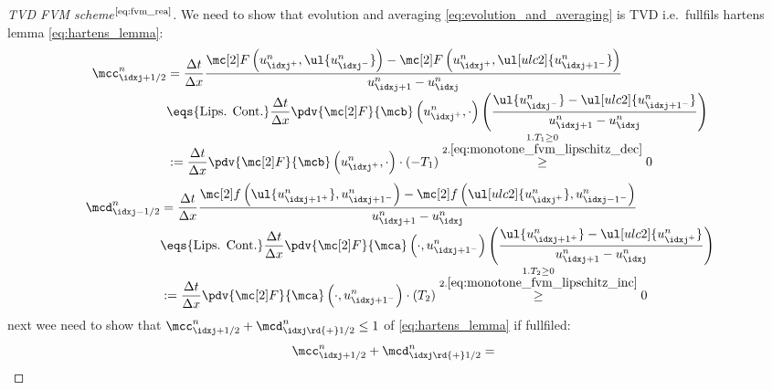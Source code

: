 \begin{proofbox}\nospacing
    \begin{proof}[TVD FVM scheme$^{\text{\cref{eq:fvm_rea}}}$]\label{proof:eq:fvm_rea}
        We need to show that evolution and averaging \cref{eq:evolution_and_averaging} is TVD i.e.\ fullfils hartens lemma \cref{eq:hartens_lemma}:
        \begin{align*}
          \mcc_{\idxj+1/2}^{n}&=\frac{\Delta t}{\Delta x}\frac{\Flux \left(u_{\idxj^+}^{n},\ul{u_{\idxj^{-}}^{n}}\right)-\Flux \left(u_{\idxj^+}^{n},\ul[ulc2]{u_{\idxj+1^{-}}^{n}}\right)}{u_{\idxj+1}^{n}-u_{\idxj}^{n}}\nonumber\\[-1\jot]
                              &\eqs{\text{Lips. Cont.}}\frac{\Delta t}{\Delta x}\pdv{\Flux}{\mcb}\left(u_{\idxj^{+}}^{n},\cdot\right)
                                \left(\frac{\ul{u_{\idxj^{-}}^{n}}-\ul[ulc2]{u_{\idxj+1^{-}}^{n}}}{u_{\idxj+1}^{n}-u_{\idxj}^{n}}\right)\\[-1\jot]
                              &:=\frac{\Delta t}{\Delta x}\pdv{\Flux}{\mcb}\left(u_{\idxj^{+}}^{n},\cdot\right)\cdot\left(-T_{1}\right)
                          \stackrel{\substack{1. T_{1}\geq0 \\2. \cref{eq:monotone_fvm_lipschitz_dec}}}{\geq}0
        \end{align*}
        \begin{align*}
          \mcd_{\idxj-1/2}^{n}&=\frac{\Delta t}{\Delta x}\frac{\flux \left(\ul{u_{\idxj+1^+}^{n}},u_{\idxj+1^{-}}^{n}\right)-\flux \left(\ul[ulc2]{u_{\idxj^+}^{n}},u_{\idxj-1^{-}}^{n}\right)}{u_{\idxj+1}^{n}-u_{\idxj}^{n}}\nonumber\\[-1\jot]
                              &\eqs{\text{Lips. Cont.}}\frac{\Delta t}{\Delta x}\pdv{\Flux}{\mca}\left(\cdot,u_{\idxj+1^{-}}^{n}\right)
                                \left(\frac{\ul{u_{\idxj+1^{+}}^{n}}-\ul[ulc2]{u_{\idxj^{+}}^{n}}}{u_{\idxj+1}^{n}-u_{\idxj}^{n}}\right)\\[-1\jot]
                              &:=\frac{\Delta t}{\Delta x}\pdv{\Flux}{\mca}\left(\cdot,u_{\idxj+1^{-}}^{n}\right)\cdot\left(T_{2}\right)
                          \stackrel{\substack{1. T_{2}\geq0 \\2. \cref{eq:monotone_fvm_lipschitz_inc}}}{\geq}0
        \end{align*}
        next wee need to show that $\mcc_{\idxj+1/2}^{n}+\mcd_{\idxj\rd{+}1/2}^{n}\leq1$ of \cref{eq:hartens_lemma} if fullfiled:
        \begin{align*}
          \mcc_{\idxj+1/2}^{n}+\mcd_{\idxj\rd{+}1/2}^{n}=&

\end{align*}
\end{proof}
\end{proofbox}
